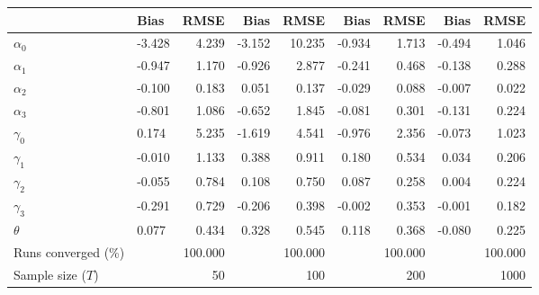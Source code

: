 
\begin{tabular}[t]{llrrrrrrr}
\toprule
  & Bias & RMSE & Bias & RMSE & Bias & RMSE & Bias & RMSE\\
\midrule
$\alpha_{0}$ & -3.428 & 4.239 & -3.152 & 10.235 & -0.934 & 1.713 & -0.494 & 1.046\\
$\alpha_{1}$ & -0.947 & 1.170 & -0.926 & 2.877 & -0.241 & 0.468 & -0.138 & 0.288\\
$\alpha_{2}$ & -0.100 & 0.183 & 0.051 & 0.137 & -0.029 & 0.088 & -0.007 & 0.022\\
$\alpha_{3}$ & -0.801 & 1.086 & -0.652 & 1.845 & -0.081 & 0.301 & -0.131 & 0.224\\
$\gamma_{0}$ & 0.174 & 5.235 & -1.619 & 4.541 & -0.976 & 2.356 & -0.073 & 1.023\\
$\gamma_{1}$ & -0.010 & 1.133 & 0.388 & 0.911 & 0.180 & 0.534 & 0.034 & 0.206\\
$\gamma_{2}$ & -0.055 & 0.784 & 0.108 & 0.750 & 0.087 & 0.258 & 0.004 & 0.224\\
$\gamma_{3}$ & -0.291 & 0.729 & -0.206 & 0.398 & -0.002 & 0.353 & -0.001 & 0.182\\
$\theta$ & 0.077 & 0.434 & 0.328 & 0.545 & 0.118 & 0.368 & -0.080 & 0.225\\
Runs converged (\%) &  & 100.000 &  & 100.000 &  & 100.000 &  & 100.000\\
Sample size ($T$) &  & 50 &  & 100 &  & 200 &  & 1000\\
\bottomrule
\end{tabular}
